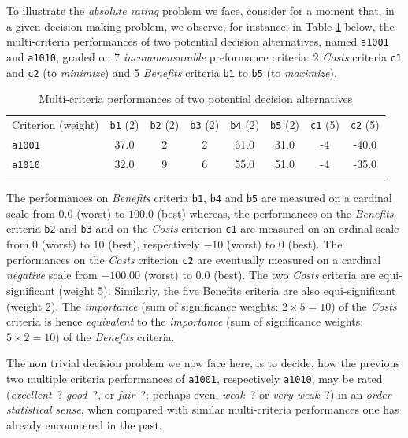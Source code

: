 To illustrate the \emph{absolute rating} problem we face, consider for a moment that, in a given decision making problem, we observe, for instance, in Table \ref{tab:10.1} below, the multi-criteria performances of two potential decision alternatives, named \texttt{a1001} and \texttt{a1010}, graded on 7 \emph{incommensurable} preformance criteria: 2 \emph{Costs} criteria \texttt{c1} and \texttt{c2} (to \emph{minimize}) and 5 \emph{Benefits} criteria \texttt{b1} to \texttt{b5} (to \emph{maximize}). 
\begin{table}[h]
\caption{Multi-criteria performances of two potential decision alternatives}
\label{tab:10.1}       %
\begin{center}
    \begin{tabular}{l|c|c|c|c|c|c|c}
      \svhline\noalign{\smallskip}
      Criterion (weight) & \texttt{b1} (2) & \texttt{b2} (2) & \texttt{b3} (2) & \texttt{b4} (2) & \texttt{b5} (2) & \texttt{c1} (5) & \texttt{c2} (5)\\
      \noalign{\smallskip}\hline\noalign{\smallskip}
    \texttt{a1001} &   37.0  &  2 & 2 & 61.0 & 31.0 & -4 & -40.0\\
    \texttt{a1010} &   32.0 & 9 & 6 & 55.0 & 51.0 & -4 & -35.0 \\
      \noalign{\smallskip}\hline
    \end{tabular}
\end{center}
\end{table}
The performances on \emph{Benefits} criteria \texttt{b1}, \texttt{b4} and \texttt{b5} are measured on a cardinal scale from $0.0$ (worst) to $100.0$ (best) whereas, the performances on the \emph{Benefits} criteria \texttt{b2} and \texttt{b3}  and on the \emph{Costs} criterion \texttt{c1} are measured on an ordinal scale from $0$ (worst) to $10$ (best), respectively $-10$ (worst) to $0$ (best). The performances on the \emph{Costs} criterion \texttt{c2} are eventually measured on a cardinal \emph{negative} scale from $-100.00$ (worst) to $0.0$ (best). The two \emph{Costs} criteria are equi-significant (weight 5). Similarly, the five Benefits criteria are also equi-significant (weight 2). The \emph{importance} (sum of significance weights: $2 \times 5 = 10$) of the \emph{Costs} criteria is hence \emph{equivalent} to the \emph{importance} (sum of significance weights: $5 \times 2 = 10$) of the \emph{Benefits} criteria.
   
The non trivial decision problem we now face here, is to decide, how the previous two multiple criteria performances of \texttt{a1001}, respectively \texttt{a1010},  may be rated (\emph{excellent}~? \emph{good}~?, or \emph{fair}~?; perhaps even, \emph{weak}~? or \emph{very weak}~?) in an \emph{order statistical sense}, when compared with similar multi-criteria performances one has already encountered in the past. 

